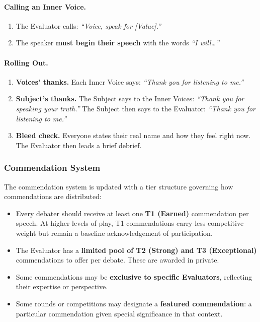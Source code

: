 \paragraph{Calling an Inner Voice.}
\begin{enumerate}
    \item The Evaluator calls: \textit{``Voice, speak for [Value].''}
    \item The speaker \textbf{must begin their speech} with the words \textit{``I will\ldots''}
\end{enumerate}

\paragraph{Rolling Out.}
\begin{enumerate}
    \item \textbf{Voices' thanks.} Each Inner Voice says: \textit{``Thank you for listening to me.''}
    \item \textbf{Subject's thanks.} The Subject says to the Inner Voices: \textit{``Thank you for speaking your truth.''} The Subject then says to the Evaluator: \textit{``Thank you for listening to me.''}
    \item \textbf{Bleed check.} Everyone states their real name and how they feel right now. The Evaluator then leads a brief debrief.
\end{enumerate}

\subsubsection{Commendation System}

The commendation system is updated with a tier structure governing how commendations are distributed:

\begin{itemize}
    \item Every debater should receive at least one \textbf{T1 (Earned)} commendation per speech. At higher levels of play, T1 commendations carry less competitive weight but remain a baseline acknowledgement of participation.
    \item The Evaluator has a \textbf{limited pool of T2 (Strong) and T3 (Exceptional)} commendations to offer per debate. These are awarded in private.
    \item Some commendations may be \textbf{exclusive to specific Evaluators}, reflecting their expertise or perspective.
    \item Some rounds or competitions may designate a \textbf{featured commendation}: a particular commendation given special significance in that context.
\end{itemize}

